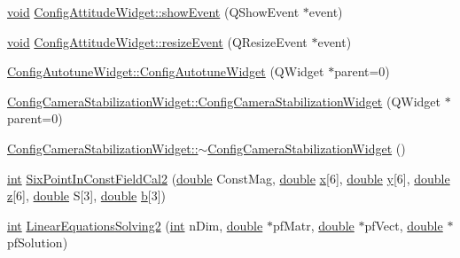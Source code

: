 \begin{DoxyCompactItemize}
\item 
\hyperlink{group___u_a_v_objects_plugin_ga444cf2ff3f0ecbe028adce838d373f5c}{void} \hyperlink{group___config_plugin_ga3a79765d89dea1538f1c4393e19a2f39}{Config\-Attitude\-Widget\-::show\-Event} (Q\-Show\-Event $\ast$event)
\item 
\hyperlink{group___u_a_v_objects_plugin_ga444cf2ff3f0ecbe028adce838d373f5c}{void} \hyperlink{group___config_plugin_ga6422c7d13c247e91f9f9f9bc1d5a8531}{Config\-Attitude\-Widget\-::resize\-Event} (Q\-Resize\-Event $\ast$event)
\item 
\hyperlink{group___config_plugin_ga989f53fb20055f01ad3e2b5b08a6103f}{Config\-Autotune\-Widget\-::\-Config\-Autotune\-Widget} (Q\-Widget $\ast$parent=0)
\item 
\hyperlink{group___config_plugin_gaadc56cb83f84d7f34491592b248a111a}{Config\-Camera\-Stabilization\-Widget\-::\-Config\-Camera\-Stabilization\-Widget} (Q\-Widget $\ast$parent=0)
\item 
\hyperlink{group___config_plugin_ga6294d4eae582574215951c5213ae4e0b}{Config\-Camera\-Stabilization\-Widget\-::$\sim$\-Config\-Camera\-Stabilization\-Widget} ()
\item 
\hyperlink{ioapi_8h_a787fa3cf048117ba7123753c1e74fcd6}{int} \hyperlink{group___config_plugin_ga6ed065f6a9a58eb96dab22485bcf48ee}{Six\-Point\-In\-Const\-Field\-Cal2} (\hyperlink{_super_l_u_support_8h_a8956b2b9f49bf918deed98379d159ca7}{double} Const\-Mag, \hyperlink{_super_l_u_support_8h_a8956b2b9f49bf918deed98379d159ca7}{double} \hyperlink{glext_8h_a1db9d104e3c2128177f26aff7b46982f}{x}\mbox{[}6\mbox{]}, \hyperlink{_super_l_u_support_8h_a8956b2b9f49bf918deed98379d159ca7}{double} \hyperlink{glext_8h_a42315f3ed8fff752bb47fd782309fcfc}{y}\mbox{[}6\mbox{]}, \hyperlink{_super_l_u_support_8h_a8956b2b9f49bf918deed98379d159ca7}{double} \hyperlink{glext_8h_a642c8d69fd1a54f255c898df4f0dd7ca}{z}\mbox{[}6\mbox{]}, \hyperlink{_super_l_u_support_8h_a8956b2b9f49bf918deed98379d159ca7}{double} S\mbox{[}3\mbox{]}, \hyperlink{_super_l_u_support_8h_a8956b2b9f49bf918deed98379d159ca7}{double} \hyperlink{glext_8h_a6eba317e3cf44d6d26c04a5a8f197dcb}{b}\mbox{[}3\mbox{]})
\item 
\hyperlink{ioapi_8h_a787fa3cf048117ba7123753c1e74fcd6}{int} \hyperlink{group___config_plugin_gae36fbabaf3892d933d17f670d77cb208}{Linear\-Equations\-Solving2} (\hyperlink{ioapi_8h_a787fa3cf048117ba7123753c1e74fcd6}{int} n\-Dim, \hyperlink{_super_l_u_support_8h_a8956b2b9f49bf918deed98379d159ca7}{double} $\ast$pf\-Matr, \hyperlink{_super_l_u_support_8h_a8956b2b9f49bf918deed98379d159ca7}{double} $\ast$pf\-Vect, \hyperlink{_super_l_u_support_8h_a8956b2b9f49bf918deed98379d159ca7}{double} $\ast$pf\-Solution)

\end{DoxyCompactItemize}
